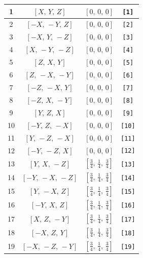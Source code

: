 \documentclass[fleqn,8pt]{jsarticle}
\begin{document}
\begin{longtable}{cccc}
1 & $\left[ X,\, Y,\, Z \right]$ & $\left[ 0,\, 0,\, 0 \right]$ & {\tt [1]} \\ \hline
2 & $\left[ - X,\, - Y,\, Z \right]$ & $\left[ 0,\, 0,\, 0 \right]$ & {\tt [2]} \\ \hline
3 & $\left[ - X,\, Y,\, - Z \right]$ & $\left[ 0,\, 0,\, 0 \right]$ & {\tt [3]} \\ \hline
4 & $\left[ X,\, - Y,\, - Z \right]$ & $\left[ 0,\, 0,\, 0 \right]$ & {\tt [4]} \\ \hline
5 & $\left[ Z,\, X,\, Y \right]$ & $\left[ 0,\, 0,\, 0 \right]$ & {\tt [5]} \\ \hline
6 & $\left[ Z,\, - X,\, - Y \right]$ & $\left[ 0,\, 0,\, 0 \right]$ & {\tt [6]} \\ \hline
7 & $\left[ - Z,\, - X,\, Y \right]$ & $\left[ 0,\, 0,\, 0 \right]$ & {\tt [7]} \\ \hline
8 & $\left[ - Z,\, X,\, - Y \right]$ & $\left[ 0,\, 0,\, 0 \right]$ & {\tt [8]} \\ \hline
9 & $\left[ Y,\, Z,\, X \right]$ & $\left[ 0,\, 0,\, 0 \right]$ & {\tt [9]} \\ \hline
10 & $\left[ - Y,\, Z,\, - X \right]$ & $\left[ 0,\, 0,\, 0 \right]$ & {\tt [10]} \\ \hline
11 & $\left[ Y,\, - Z,\, - X \right]$ & $\left[ 0,\, 0,\, 0 \right]$ & {\tt [11]} \\ \hline
12 & $\left[ - Y,\, - Z,\, X \right]$ & $\left[ 0,\, 0,\, 0 \right]$ & {\tt [12]} \\ \hline
13 & $\left[ Y,\, X,\, - Z \right]$ & $\left[ \frac{3}{4},\, \frac{1}{4},\, \frac{3}{4} \right]$ & {\tt [13]} \\ \hline
14 & $\left[ - Y,\, - X,\, - Z \right]$ & $\left[ \frac{3}{4},\, \frac{1}{4},\, \frac{3}{4} \right]$ & {\tt [14]} \\ \hline
15 & $\left[ Y,\, - X,\, Z \right]$ & $\left[ \frac{3}{4},\, \frac{1}{4},\, \frac{3}{4} \right]$ & {\tt [15]} \\ \hline
16 & $\left[ - Y,\, X,\, Z \right]$ & $\left[ \frac{3}{4},\, \frac{1}{4},\, \frac{3}{4} \right]$ & {\tt [16]} \\ \hline
17 & $\left[ X,\, Z,\, - Y \right]$ & $\left[ \frac{3}{4},\, \frac{1}{4},\, \frac{3}{4} \right]$ & {\tt [17]} \\ \hline
18 & $\left[ - X,\, Z,\, Y \right]$ & $\left[ \frac{3}{4},\, \frac{1}{4},\, \frac{3}{4} \right]$ & {\tt [18]} \\ \hline
19 & $\left[ - X,\, - Z,\, - Y \right]$ & $\left[ \frac{3}{4},\, \frac{1}{4},\, \frac{3}{4} \right]$ & {\tt [19]} \\ \hline

\end{longtable}
\end{document}
